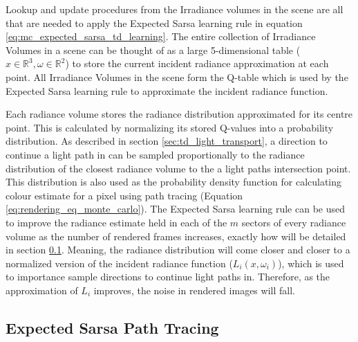 \documentclass[../dissertation.tex]{subfiles}
\begin{document}
Lookup and update procedures from the Irradiance volumes in the scene are all that are needed to apply the Expected Sarsa learning rule in equation \ref{eq:mc_expected_sarsa_td_learning}. The entire collection of Irradiance Volumes in a scene can be thought of as a large 5-dimensional table ($x \in \mathbb{R}^3, \omega \in \mathbb{R}^2$) to store the current incident radiance approximation at each point. All Irradiance Volumes in the scene form the Q-table which is used by the Expected Sarsa learning rule to approximate the incident radiance function.

Each radiance volume stores the radiance distribution approximated for its centre point. This is calculated by normalizing its stored Q-values into a probability distribution. As described in section \ref{sec:td_light_transport}, a direction to continue a light path in can be sampled proportionally to the radiance distribution of the closest radiance volume to the a light paths intersection point. This distribution is also used as the probability density function for calculating colour estimate for a pixel using path tracing (Equation \ref{eq:rendering_eq_monte_carlo}). The Expected Sarsa learning rule can be used to improve the radiance estimate held in each of the $m$ sectors of every radiance volume as the number of rendered frames increases, exactly how will be detailed in section \ref{sec:expected_sarsa_path_tracer}. Meaning, the radiance distribution will come closer and closer to a normalized version of the incident radiance function ($L_i(x, \omega_i)$), which is used to importance sample directions to continue light paths in. Therefore, as the approximation of $L_i$ improves, the noise in rendered images will fall.

\subsection{Expected Sarsa Path Tracing}
\label{sec:expected_sarsa_path_tracer}
\end{document}
